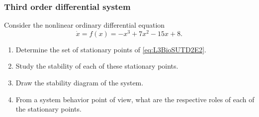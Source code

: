 \subsubsection{Third order differential system} 

Consider the nonlinear ordinary differential equation\begin{equation} \label{eq:L3BioSUTD2E2}
\dot x = f(x) = -x^3 + 7x^2 - 15x + 8.
\end{equation}

\begin{enumerate}
  \item Determine the set of stationary points of \eqref{eq:L3BioSUTD2E2}.
  \item Study the stability of each of these stationary points.
  \item Draw the stability diagram of the system.
  \item From a system behavior point of view, what are the respective roles of each of the stationary points.
\end{enumerate}

